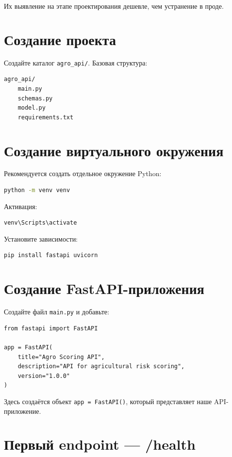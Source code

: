 \documentclass[12pt,a4paper]{article}
\begin{document}
Их выявление на этапе проектирования дешевле, чем устранение в проде.

\section{Создание проекта}

Создайте каталог \texttt{agro\_api/}. Базовая структура:

\begin{lstlisting}[language=bash, caption={Базовая структура проекта}]
agro_api/
    main.py
    schemas.py
    model.py
    requirements.txt
\end{lstlisting}

\section{Создание виртуального окружения}

Рекомендуется создать отдельное окружение Python:

\begin{lstlisting}[language=bash]
python -m venv venv
\end{lstlisting}

Активация:

\begin{lstlisting}[language=bash]
venv\Scripts\activate
\end{lstlisting}

Установите зависимости:

\begin{lstlisting}[language=bash]
pip install fastapi uvicorn
\end{lstlisting}

\section{Создание FastAPI-приложения}

Создайте файл \texttt{main.py} и добавьте:

\begin{lstlisting}[caption={Инициализация FastAPI-приложения}]
from fastapi import FastAPI

app = FastAPI(
    title="Agro Scoring API",
    description="API for agricultural risk scoring",
    version="1.0.0"
)
\end{lstlisting}

Здесь создаётся объект \texttt{app = FastAPI()}, который представляет наше API-приложение.

\section{Первый endpoint — /health}
\end{document}
